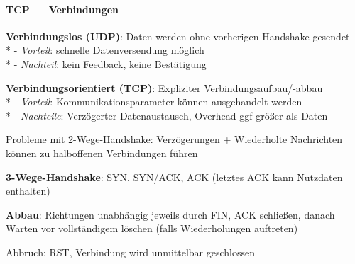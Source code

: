 \paragraph{TCP --- Verbindungen}
\begin{items}
  \item \textbf{Verbindungslos (UDP)}: Daten werden ohne vorherigen Handshake gesendet \\*
    - \emph{Vorteil}: schnelle Datenversendung möglich \\*
    - \emph{Nachteil}: kein Feedback, keine Bestätigung
  \item \textbf{Verbindungsorientiert (TCP)}: Expliziter Verbindungsaufbau/-abbau \\*
    - \emph{Vorteil}: Kommunikationsparameter können ausgehandelt werden \\*
    - \emph{Nachteile}: Verzögerter Datenaustausch, Overhead ggf größer als Daten
    \item Probleme mit 2-Wege-Handshake: Verzögerungen + Wiederholte Nachrichten können zu halboffenen Verbindungen führen
    \item \textbf{3-Wege-Handshake}: SYN, SYN/ACK, ACK (letztes ACK kann Nutzdaten enthalten)
    \item \textbf{Abbau}: Richtungen unabhängig jeweils durch FIN, ACK schließen, danach Warten vor vollständigem löschen (falls Wiederholungen auftreten)
    \item Abbruch: RST, Verbindung wird unmittelbar geschlossen
\end{items}


